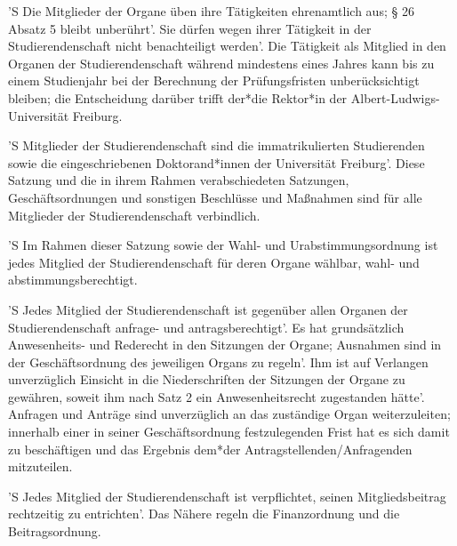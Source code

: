 \documentclass[fontsize=12pt,parskip=half]{scrartcl}
\begin{document}
\begin{contract}
  'S Die Mitglieder der Organe üben ihre Tätigkeiten ehrenamtlich aus; § 26 Absatz
  5 bleibt unberührt'. Sie dürfen wegen ihrer Tätigkeit in der Studierendenschaft
  nicht benachteiligt werden'. Die Tätigkeit als Mitglied in den Organen der
  Studierendenschaft während mindestens eines Jahres kann bis zu einem
  Studienjahr bei der Berechnung der Prüfungsfristen unberücksichtigt bleiben;
  die Entscheidung darüber trifft der*die Rektor*in der
  Albert-Ludwigs-Universität Freiburg.



  'S Mitglieder der Studierendenschaft sind die immatrikulierten Studierenden sowie
  die eingeschriebenen Doktorand*innen der Universität Freiburg'. Diese Satzung
  und die in ihrem Rahmen verabschiedeten Satzungen, Geschäftsordnungen und
  sonstigen Beschlüsse und Maßnahmen sind für alle Mitglieder der
  Studierendenschaft verbindlich.

  'S Im Rahmen dieser Satzung sowie der Wahl- und Urabstimmungsordnung ist jedes
  Mitglied der Studierendenschaft für deren Organe wählbar, wahl- und
  abstimmungsberechtigt.

  'S Jedes Mitglied der Studierendenschaft ist gegenüber allen Organen der
  Studierendenschaft anfrage- und antragsberechtigt'. Es hat grundsätzlich
  Anwesenheits- und Rederecht in den Sitzungen der Organe; Ausnahmen sind in der
  Geschäftsordnung des jeweiligen Organs zu regeln'. Ihm ist auf Verlangen
  unverzüglich Einsicht in die Niederschriften der Sitzungen der Organe zu
  gewähren, soweit ihm nach Satz 2 ein Anwesenheitsrecht zugestanden hätte'.
  Anfragen und Anträge sind unverzüglich an das zuständige Organ weiterzuleiten;
  innerhalb einer in seiner Geschäftsordnung festzulegenden Frist hat es sich
  damit zu beschäftigen und das Ergebnis dem*der Antragstellenden/Anfragenden
  mitzuteilen.

  'S Jedes Mitglied der Studierendenschaft ist verpflichtet, seinen
  Mitgliedsbeitrag rechtzeitig zu entrichten'. Das Nähere regeln die
  Finanzordnung und die Beitragsordnung.

\end{contract}

\end{document}

